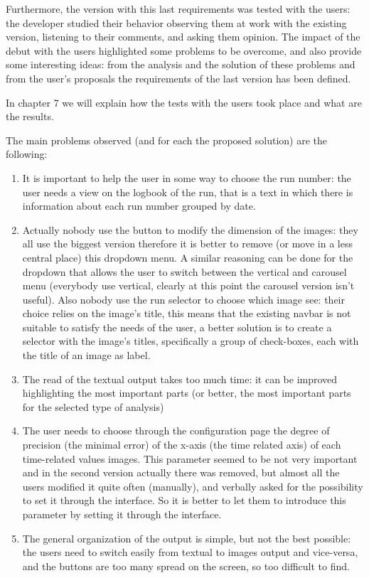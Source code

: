 
Furthermore, the version with this last requirements was tested with the users: the developer studied their behavior observing them at work with the existing version, listening to their comments, and asking them opinion. The impact of the debut with the users highlighted some problems to be overcome, and also provide some interesting ideas: from the analysis and the solution of these problems and from the user's proposals the requirements of the last version has been defined. 

In chapter 7 we will explain how the tests with the users took place and what are the results.

The main problems observed (and for each the proposed solution) are the following:

\begin{enumerate}
\item 
It is important to help the user in some way to choose the run number: the user needs a view on the logbook of the run, that is a text in which there is information about each run number grouped by date.

\item
Actually nobody use the button to modify the dimension of the images: they all use the biggest version therefore it is better to remove (or move in a less central place) this dropdown menu. A similar reasoning can be done for the dropdown that allows the user to switch between the vertical and carousel menu (everybody use vertical, clearly at this point the carousel version isn't useful). Also nobody use the run selector to choose which image see: their choice relies on the image's title, this means that the existing navbar is not suitable to satisfy the needs of the user, a better solution is to create a selector with the image's titles, specifically a group of check-boxes, each with the title of an image as label.  

\item
The read of the textual output takes too much time: it can be improved highlighting the most important parts (or better, the most important parts for the selected type of analysis)

\item
The user needs to choose through the configuration page the degree of precision (the minimal error) of the x-axis (the time related axis) of each time-related values images. This parameter seemed to be not very important and in the second version actually there was removed, but almost all the users modified it quite often (manually), and verbally asked for the possibility to set it through the interface. So it is better to let them to introduce this parameter by setting it through the interface.

\item
The general organization of the output is simple, but not the best possible: the users need to switch easily from textual to images output and vice-versa, and the buttons are too many spread on the screen, so too difficult to find.

\end{enumerate}

